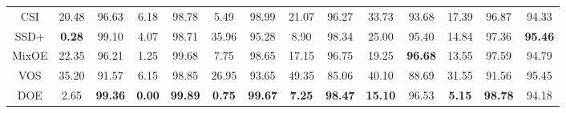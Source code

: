 \documentclass{article} \usepackage{iclr2022_conference,times}
\begin{document}
\begin{table}[t]
{\begin{tabular}{c|cccccccccccc|c}
CSI         & 20.48 & 96.63 & 6.18 & 98.78 & 5.49 & 98.99 & 21.07 & 96.27 & 33.73 & 93.68 & 17.39 & 96.87 & 94.33 \\
SSD+        &  \textbf{0.28} & 99.10 &  4.07 & 98.71 & 35.96 & 95.28 &  8.90 & 98.34 & 25.00 & 95.40 & 14.84 & 97.36 & \textbf{95.46} \\
MixOE       & 22.35 & 96.21 &  1.25 & 99.68 &  7.75 & 98.65 & 17.15 & 96.75 & 19.25 & \textbf{96.68} & 13.55 & 97.59 & 94.79 \\
VOS         & 35.20 & 91.57 &  6.15 & 98.85 & 26.95 & 93.65 & 49.35 & 85.06 & 40.10 & 88.69 & 31.55 & 91.56 & 95.45 \\
\hline
DOE         &  2.65 & \textbf{99.36} &  \textbf{0.00} & \textbf{99.89} &  \textbf{0.75} & \textbf{99.67} &  \textbf{7.25} & \textbf{98.47} & \textbf{15.10} & {96.53} &  \textbf{5.15} & \textbf{98.78} & 94.18 \\
\bottomrule[1.5pt]   
\end{tabular}}
\end{table}
\end{document}
